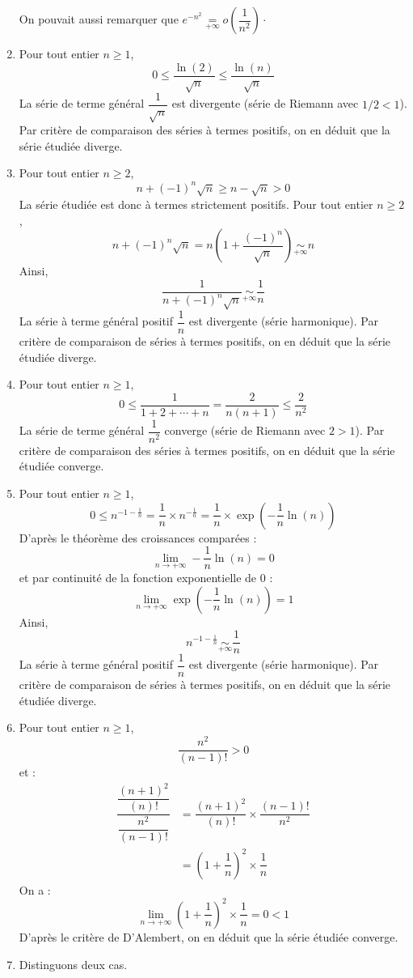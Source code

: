 \documentclass[a4paper,10pt]{report}
\begin{document}
\begin{enumerate}
\noindent On pouvait aussi remarquer que $e^{-n^2} \underset{+ \infty}{=} o \left( \dfrac{1}{n^2} \right) \cdot$
\item Pour tout entier $n \geq 1$,
$$ 0 \leq \dfrac{\ln(2)}{\sqrt{n}} \leq \dfrac{\ln(n)}{\sqrt{n}}$$
La série de terme général $\dfrac{1}{\sqrt{n}}$ est divergente (série de Riemann avec $1/2<1$). Par critère de comparaison des séries à termes positifs, on en déduit que la série étudiée diverge.
\item Pour tout entier $n \geq 2$,
$$ n+(-1)^n \sqrt{n} \geq n- \sqrt{n} >0$$
La série étudiée est donc à termes strictement positifs. Pour tout entier $n \geq 2$,
$$ n+(-1)^n \sqrt{n} = n \left( 1 + \dfrac{(-1)^n}{\sqrt{n}} \right) \underset{+ \infty}{\sim} n$$
Ainsi,
$$ \dfrac{1}{n+(-1)^n \sqrt{n}} \underset{+ \infty}{\sim} \dfrac{1}{n}$$
La série à terme général positif $\dfrac{1}{n}$ est divergente (série harmonique). Par critère de comparaison de séries à termes positifs, on en déduit que la série étudiée diverge.
\item Pour tout entier $n \geq 1$,
$$ 0 \leq \dfrac{1}{1+2+ \cdots + n}  = \dfrac{2}{n(n+1)} \leq \dfrac{2}{n^2}$$
La série de terme général $\dfrac{1}{n^2}$ converge (série de Riemann avec $2>1$). Par critère de comparaison des séries à termes positifs, on en déduit que la série étudiée converge.
\item Pour tout entier $n \geq 1$,
$$ 0 \leq n^{-1- \frac{1}{n}} = \dfrac{1}{n} \times n^{- \frac{1}{n}} = \dfrac{1}{n} \times \exp \left( - \dfrac{1}{n} \ln(n) \right)$$
D'après le théorème des croissances comparées :
$$ \lim_{n \rightarrow + \infty}  - \dfrac{1}{n} \ln(n) = 0$$
et par continuité de la fonction exponentielle de $0$ :
$$ \lim_{n \rightarrow + \infty}  \exp \left( - \dfrac{1}{n} \ln(n) \right) = 1$$
Ainsi,
$$ n^{-1- \frac{1}{n}}  \underset{+ \infty}{\sim} \dfrac{1}{n}$$
La série à terme général positif $\dfrac{1}{n}$ est divergente (série harmonique). Par critère de comparaison de séries à termes positifs, on en déduit que la série étudiée diverge.
\item Pour tout entier $n \geq 1$,
$$  \dfrac{n^2}{(n-1)!} >0$$
et :
\begin{align*}
\dfrac{ \dfrac{(n+1)^2}{(n)!}}{ \dfrac{n^2}{(n-1)!}}  & = \dfrac{(n+1)^2}{(n)!} \times \dfrac{(n-1)!}{n^2} \\
& = \left(1+ \dfrac{1}{n}\right)^2 \times \dfrac{1}{n}
\end{align*}
On a :
$$ \lim_{n \rightarrow + \infty}  \left(1+ \dfrac{1}{n}\right)^2 \times \dfrac{1}{n} = 0 <1$$
D'après le critère de D'Alembert, on en déduit que la série étudiée converge.
\item Distinguons deux cas.


\end{enumerate}
\end{document}
